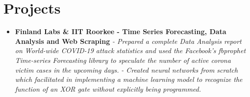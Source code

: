 \documentclass{article}
\begin{document}
\section*{Projects}
\begin{itemize}


    \item{\textbf{\large{Finland Labs \& IIT Roorkee - Time Series Forecasting, Data Analysis and Web Scraping}}}
          \newline
          \textit{- Prepared a complete Data Analysis report on World-wide COVID-19 attack statistics and used the Facebook's fbprophet Time-series Forecasting library to speculate the number of active corona victim cases in the upcoming days.}\newline
          \textit{- Created neural networks from scratch which facilitated in implementing a machine learning model to recognize the function of an XOR gate without explicitly being programmed.}%


\end{itemize}
\end{document}
